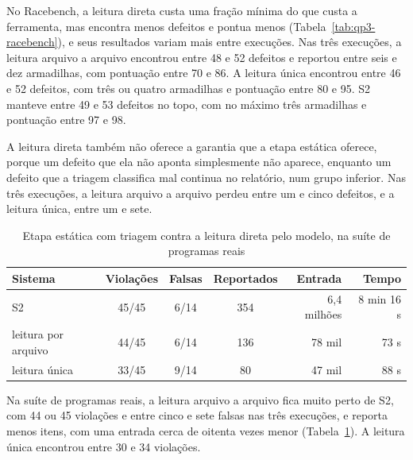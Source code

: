 No Racebench, a leitura direta custa uma fração mínima do que custa a ferramenta, mas
encontra menos defeitos e pontua menos (Tabela~\ref{tab:qp3-racebench}), e
seus resultados variam mais entre execuções. Nas três execuções, a leitura arquivo a arquivo
encontrou entre 48 e 52 defeitos e reportou entre seis e dez armadilhas, com
pontuação entre 70 e 86. A leitura única encontrou entre 46 e 52 defeitos, com
três ou quatro armadilhas e pontuação entre 80 e 95. S2 manteve entre 49 e 53
defeitos no topo, com no máximo três armadilhas e pontuação entre 97 e 98.

A leitura direta também não oferece a garantia que a etapa estática oferece,
porque um defeito que ela não aponta simplesmente não aparece, enquanto um defeito
que a triagem classifica mal continua no relatório, num grupo inferior. Nas
três execuções, a leitura arquivo a arquivo perdeu entre um e cinco defeitos, e
a leitura única, entre um e sete.

\begin{table}[htb]
  \centering
  \caption{Etapa estática com triagem contra a leitura direta pelo modelo, na
  suíte de programas reais}
  \label{tab:qp3-reais}
  \small
  \begin{tabular}{|l|c|c|c|r|r|}
    \hline
    Sistema & Violações & Falsas & Reportados & Entrada & Tempo \\
    \hline
    S2 & 45/45 & 6/14 & 354 & 6,4 milhões & 8 min 16 s \\
    leitura por arquivo & 44/45 & 6/14 & 136 & 78 mil & 73 s \\
    leitura única & 33/45 & 9/14 & 80 & 47 mil & 88 s \\
    \hline
  \end{tabular}
\end{table}

Na suíte de programas reais, a leitura arquivo a arquivo fica muito perto de
S2, com 44 ou 45 violações e entre cinco e sete falsas nas três execuções, e
reporta menos itens, com uma entrada cerca de oitenta vezes menor
(Tabela~\ref{tab:qp3-reais}). A leitura única encontrou entre 30 e 34
violações.

